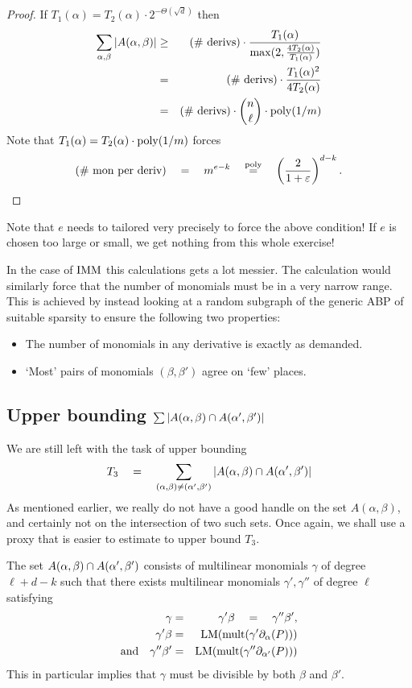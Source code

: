 \begin{proof}
If $T_1(\alpha) = T_2(\alpha) \cdot 2^{-\Theta(\sqrt{d})}$ then
\begin{eqnarray*}
\sum_{\alpha,\beta}\left|A(\alpha, \beta)\right| &\geq& \text{(\# derivs)}\cdot \frac{T_1(\alpha)}{\max(2, \frac{4T_2(\alpha)}{T_1(\alpha)})}\\
 & = & \text{(\# derivs)} \cdot \frac{T_1(\alpha)^2}{4 T_2(\alpha)}\\
 & = & \text{(\# derivs)} \cdot \binom{n}{\ell} \cdot \mathrm{poly}(1/m)
\end{eqnarray*}
Note that $T_1(\alpha) = T_2(\alpha) \cdot \mathrm{poly}(1/m)$ forces 
\[
\text{(\# mon per deriv)} \quad = \quad  m^{e-k} \quad \stackrel{\mathrm{poly}}{=} \quad  \left(\frac{2}{1+\varepsilon}\right)^{d-k}.
\]
\end{proof}

Note that $e$ needs to tailored very precisely to force the above condition! 
If $e$ is chosen too large or small, we get nothing from this whole exercise!

In the case of $\mathrm{IMM}$ this calculations gets a lot messier. 
The calculation would similarly force that the number of monomials must be in a very narrow range. 
This is achieved by instead looking at a random subgraph of the generic ABP of suitable sparsity to ensure the following two properties:
\begin{itemize}
  \item The number of monomials in any derivative is exactly as demanded. 
  \item `Most' pairs of monomials $(\beta, \beta')$ agree on `few' places. 
\end{itemize}

\subsection*{Upper bounding $\sum \left|A(\alpha,\beta)\cap A(\alpha',\beta')\right|$}

We are still left with the task of upper bounding
\[
T_3 \quad = \quad \sum_{(\alpha, \beta)\neq (\alpha',\beta')} \left|A(\alpha, \beta) \cap A(\alpha',\beta')\right|
\]
As mentioned earlier, we really do not have a good handle on the set $A(\alpha, \beta)$, and certainly not on the intersection of two such sets. 
Once again, we shall use a proxy that is easier to estimate to upper bound $T_3$. 

The set $A(\alpha, \beta) \cap A(\alpha',\beta')$ consists of multilinear monomials $\gamma$ of degree $\ell + d -k$ such that there exists multilinear monomials $\gamma', \gamma''$ of degree $\ell$ satisfying
\begin{eqnarray*}
\gamma & = & \gamma' \beta \quad = \quad \gamma'' \beta',\\
 \gamma'\beta & = & \mathrm{LM}(\mathrm{mult}(\gamma' \partial_\alpha(P)))\\
\text{and}\quad \gamma''\beta' & = & \mathrm{LM}(\mathrm{mult}(\gamma'' \partial_{\alpha'}(P)))
\end{eqnarray*}
This in particular implies that $\gamma$ must be divisible by both $\beta$ and $\beta'$. 


